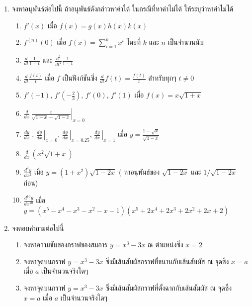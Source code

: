 \documentclass[
]{book}
\theoremstyle{definition}
\theoremstyle{definition}
\theoremstyle{definition}
\theoremstyle{definition}
\theoremstyle{remark}
\begin{document}
\begin{enumerate}
\def\labelenumi{\arabic{enumi}.}
\item
  จงหาอนุพันธ์ต่อไปนี้ ถ้าอนุพันธ์ดังกล่าวหาค่าได้ ในกรณีที่หาค่าไม่ได้ ให้ระบุว่าหาค่าไม่ได้

  \begin{enumerate}
  \def\labelenumii{\arabic{enumii}.}
  \item
    \(\displaystyle f'(x)\) เมื่อ \(f(x)=g(x)h(x)k(x)\)
  \item
    \(\displaystyle f^{(n)}(0)\) เมื่อ
    \(\displaystyle f(x)=\sum_{i=1}^k x^i\) โดยที่ \(k\) และ \(n\)
    เป็นจำนวนนับ
  \item
    \(\displaystyle\frac{d}{dt}\frac1{1-t}\) และ
    \(\displaystyle\frac{d^2}{dt^2}\frac1{1-t}\)
  \item
    \(\displaystyle\frac{d}{dt}\frac{f(t)}t\) เมื่อ \(f\) เป็นฟังก์ชันซึ่ง
    \(\displaystyle\frac{d}{dt}f(t)=\frac{f(t)}t\) สำหรับทุกๆ \(t\neq0\)
  \item
    \(f'(-1)\), \(f'(-\frac23)\), \(f'(0)\), \(f'(1)\) เมื่อ
    \(f(x)=x\sqrt{1+x}\)
  \item
    \(\displaystyle\left.\frac d{dx}\,\frac x{\sqrt{1+x}-\sqrt{1-x}}\right|_{x=0}\)
  \item
    \(\displaystyle\frac {dy}{dx}\;\),
    \(\displaystyle\left.\frac {dy}{dx}\,\right|_{x=0}\),
    \(\displaystyle\left.\frac {dy}{dx}\,\right|_{x=0.25}\),
    \(\displaystyle\left.\frac {dy}{dx}\,\right|_{x=1}\) เมื่อ
    \(\displaystyle y=\frac{1-\sqrt x}{\sqrt{1-x}}\)
  \item
    \(\displaystyle\frac d{dx}\,\left(x^2\sqrt{1+x}\right)\)
  \item
    \(\displaystyle\frac {d^2y}{dx^2}\) เมื่อ \(y=(1+x^2)\sqrt{1-2x}\) (
    หาอนุพันธ์ของ \(\sqrt{1-2x}\) และ \(1/\sqrt{1-2x}\) ก่อน)
  \item
    \(\displaystyle\frac {d^{10}y}{dx^{10}}\) เมื่อ
    \(y=\left(x^5-x^4-x^3-x^2-x-1\right)\left(x^5+2x^4+2x^3+2x^2+2x+2\right)\)
  \end{enumerate}
\item
  จงตอบคำถามต่อไปนี้

  \begin{enumerate}
  \def\labelenumii{\arabic{enumii}.}
  \item
    จงหาความชันของกราฟของสมการ \(y=x^3-3x\) ณ ตำแหน่งซึ่ง \(x=2\)
  \item
    จงหาจุดบนกราฟ \(y=x^3-3x\) ซึ่งมีเส้นสัมผัสกราฟที่ขนานกับเส้นสัมผัส ณ จุดซึ่ง
    \(x=a\) เมื่อ \(a\) เป็นจำนวนจริงใดๆ
  \item
    จงหาจุดบนกราฟ \(y=x^3-3x\) ซึ่งมีเส้นสัมผัสกราฟที่ตั้งฉากกับเส้นสัมผัส ณ จุดซึ่ง
    \(x=a\) เมื่อ \(a\) เป็นจำนวนจริงใดๆ
  \end{enumerate}
\end{enumerate}
\end{document}
